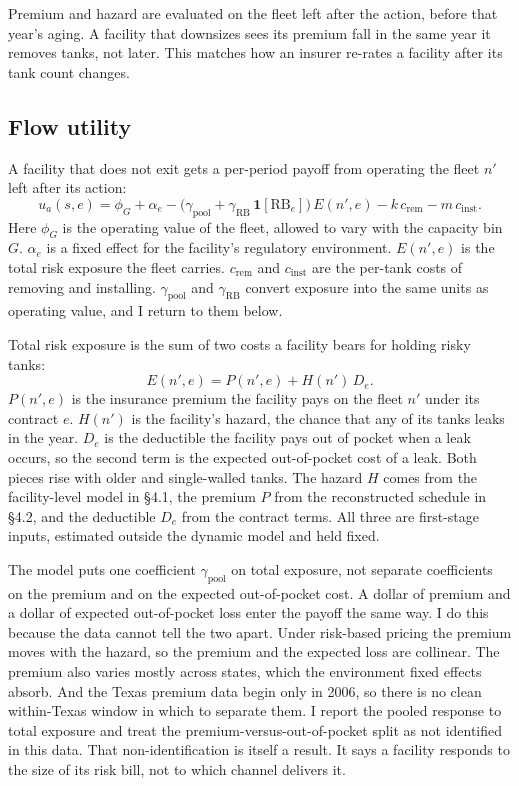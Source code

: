 \documentclass[
  12pt,
]{article}
\begin{document}
Premium and hazard are evaluated on the fleet left after the action,
before that year's aging. A facility that downsizes sees its premium
fall in the same year it removes tanks, not later. This matches how an
insurer re-rates a facility after its tank count changes.

\subsection{Flow utility}\label{flow-utility}

A facility that does not exit gets a per-period payoff from operating
the fleet \(n'\) left after its action: \[
u_a(s,e)=\phi_G+\alpha_e-\big(\gamma_{\text{pool}}+\gamma_{\text{RB}}\,\mathbf 1[\text{RB}_e]\big)\,E(n',e)-k\,c_{\text{rem}}-m\,c_{\text{inst}}.
\] Here \(\phi_G\) is the operating value of the fleet, allowed to vary
with the capacity bin \(G\). \(\alpha_e\) is a fixed effect for the
facility's regulatory environment. \(E(n',e)\) is the total risk
exposure the fleet carries. \(c_{\text{rem}}\) and \(c_{\text{inst}}\)
are the per-tank costs of removing and installing.
\(\gamma_{\text{pool}}\) and \(\gamma_{\text{RB}}\) convert exposure
into the same units as operating value, and I return to them below.

Total risk exposure is the sum of two costs a facility bears for holding
risky tanks: \[
E(n',e)=P(n',e)+H(n')\,D_e.
\] \(P(n',e)\) is the insurance premium the facility pays on the fleet
\(n'\) under its contract \(e\). \(H(n')\) is the facility's hazard, the
chance that any of its tanks leaks in the year. \(D_e\) is the
deductible the facility pays out of pocket when a leak occurs, so the
second term is the expected out-of-pocket cost of a leak. Both pieces
rise with older and single-walled tanks. The hazard \(H\) comes from the
facility-level model in §4.1, the premium \(P\) from the reconstructed
schedule in §4.2, and the deductible \(D_e\) from the contract terms.
All three are first-stage inputs, estimated outside the dynamic model
and held fixed.

The model puts one coefficient \(\gamma_{\text{pool}}\) on total
exposure, not separate coefficients on the premium and on the expected
out-of-pocket cost. A dollar of premium and a dollar of expected
out-of-pocket loss enter the payoff the same way. I do this because the
data cannot tell the two apart. Under risk-based pricing the premium
moves with the hazard, so the premium and the expected loss are
collinear. The premium also varies mostly across states, which the
environment fixed effects absorb. And the Texas premium data begin only
in 2006, so there is no clean within-Texas window in which to separate
them. I report the pooled response to total exposure and treat the
premium-versus-out-of-pocket split as not identified in this data. That
non-identification is itself a result. It says a facility responds to
the size of its risk bill, not to which channel delivers it.
\end{document}

